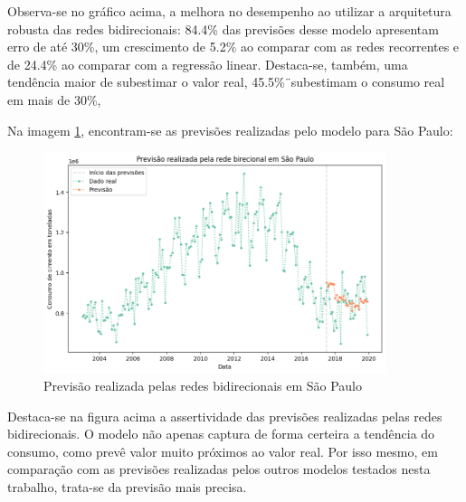 Observa-se no gráfico acima, a melhora no desempenho ao utilizar a arquitetura 
robusta das redes bidirecionais: 84.4\% das previsões desse modelo apresentam 
erro de até 30\%, um crescimento de 5.2\% ao comparar com as redes recorrentes 
e de 24.4\% ao comparar com a regressão linear. Destaca-se, também, uma tendência
maior de subestimar o valor real, 45.5\%¨subestimam o consumo real em mais de 
30\%,

Na imagem \ref{img:consumo-sp-bnn}, encontram-se as previsões realizadas pelo 
modelo para São Paulo:

\begin{figure}[H]
    \centering
    \includegraphics[width=10cm]{../figuras/graficos/bi/prev-sp-bi.png}
    \caption{Previsão realizada pelas redes bidirecionais em São Paulo}
    \label{img:consumo-sp-bnn}
\end{figure}

Destaca-se na figura acima a assertividade das previsões realizadas pelas 
redes bidirecionais. O modelo não apenas captura de forma certeira a tendência 
do consumo, como prevê valor muito próximos ao valor real. Por isso mesmo, em comparação com 
as previsões realizadas pelos outros modelos testados nesta trabalho, trata-se 
da previsão mais precisa.